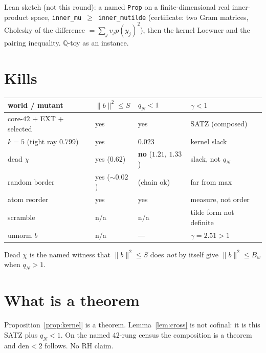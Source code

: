 \documentclass[11pt]{article}
\theoremstyle{remark}
\begin{document}
Lean sketch (not this round):
a named \texttt{Prop} on a finite-dimensional
real inner-product space,
\texttt{inner\_mu $\ge$ inner\_mutilde}
(certificate: two Gram matrices,
Cholesky of the difference
$=\sum_j v_j p(y_j)^2$),
then the kernel Loewner and the pairing
inequality.  $\mathbb{Q}$-toy as an instance.

\section{Kills}\label{sec:kills}

\begin{center}
\begin{tabular}{llll}
\toprule
world / mutant & $\|b\|^2\le S$ & $q_N<1$ & $\gamma<1$ \\
\midrule
core-$42$ + EXT + selected & yes & yes & SATZ (composed) \\
$k=5$ (tight ray $0.799$) & yes & $0.023$ & kernel slack \\
dead $\chi$ & yes ($0.62$) & \textbf{no} ($1.21$, $1.33$) & slack, not $q_N$ \\
random border & yes ($\sim 0.02$) & (chain ok) & far from max \\
atom reorder & yes & yes & measure, not order \\
scramble & n/a & n/a & tilde form not definite \\
unnorm $b$ & n/a & --- & $\gamma=2.51>1$ \\
\bottomrule
\end{tabular}
\end{center}

Dead $\chi$ is the named witness that
$\|b\|^2\le S$ does \emph{not} by itself
give $\|b\|^2\le B_w$ when $q_N>1$.

\section{What is a theorem}\label{sec:honest}

Proposition~\ref{prop:kernel} is a theorem.
Lemma~\ref{lem:cross} is not cofinal:
it is this SATZ plus $q_N<1$.
On the named $42$-rung census the composition
is a theorem and $\mathrm{den}<2$ follows.
No RH claim.
\end{document}
